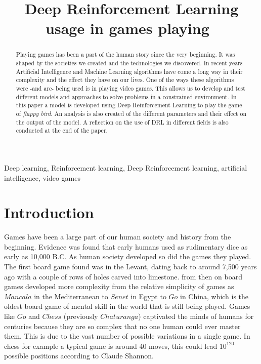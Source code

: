 \documentclass[conference]{IEEEtran}
\begin{document}
\title{Deep Reinforcement Learning usage in games playing\
}

\author{
}





\maketitle

\begin{abstract}
Playing games has been a part of the human story since the very beginning. It was shaped by the societies we created and the technologies we discovered. In recent years Artificial Intelligence and Machine Learning algorithms have come a long way in their complexity and the effect they have on our lives. One of the ways these algorithms were -and are- being used is in playing video games. This allows us to develop and test different models and approaches to solve problems in a constrained environment. In this paper a model is developed using Deep Reinforcement Learning to play the game of \textit{flappy bird}. An analysis is also created of the different parameters and their effect on the output of the model. A reflection on the use of DRL in different fields is also conducted at the end of the paper.
\end{abstract}
\begin{IEEEkeywords}
Deep learning, Reinforcement learning, Deep Reinforcement learning, artificial intelligence, video games
\end{IEEEkeywords}

\section{Introduction}
Games have been a large part of our human society and history from the beginning. Evidence was found that early humans used  as rudimentary dice as early as 10,000 B.C\cite{10.1007/978-981-10-0575-6_1}. As human society developed so did the games they played. The first board game found was in the Levant, dating back to around 7,500 years ago \cite{simpson2007earliest} with a couple of rows of holes carved into limestone. from then on board games developed more complexity from the relative simplicity of games as $Mancala$ in the Mediterranean to $Senet$ in Egypt to $Go$ in China, which is the  oldest board game of mental skill in the world that is still being played\cite{shotwell1994game}. Games like $Go$ and $Chess$ (previously $Chaturanga$) captivated the minds of humans for centuries because they are so complex that no one human could ever master them. This is due to the vast number of possible variations in a single game. In chess for example a typical game is around 40 moves, this could lead $10^{120}$ possible positions according to Claude Shannon\cite{shannon1950xxii}.
\end{document}
